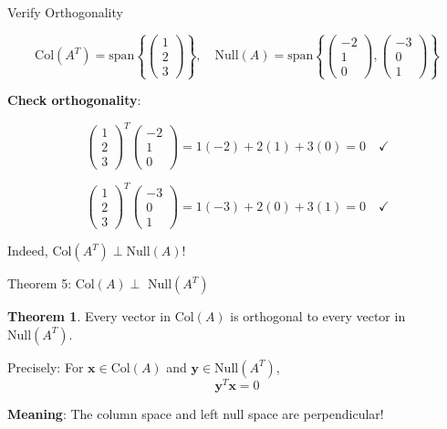 \documentclass[10pt]{beamer}
\theoremstyle{definition}
\newtheorem{thm}{Theorem}[section]
\newcommand{\x}[1]{\alert{\textbf{#1}}}
\begin{document}
\begin{frame}{Verify Orthogonality}

$$\text{Col}(A^T) = \text{span}\left\{\begin{pmatrix} 1\\2\\3 \end{pmatrix}\right\}, \quad \text{Null}(A) = \text{span}\left\{\begin{pmatrix} -2\\1\\0 \end{pmatrix}, \begin{pmatrix} -3\\0\\1 \end{pmatrix}\right\}$$

\x{Check orthogonality}:

$$\begin{pmatrix} 1\\2\\3 \end{pmatrix}^T \begin{pmatrix} -2\\1\\0 \end{pmatrix} = 1(-2) + 2(1) + 3(0) = 0 \quad \checkmark$$

$$\begin{pmatrix} 1\\2\\3 \end{pmatrix}^T \begin{pmatrix} -3\\0\\1 \end{pmatrix} = 1(-3) + 2(0) + 3(1) = 0 \quad \checkmark$$

Indeed, $\text{Col}(A^T) \perp \text{Null}(A)$!

\end{frame}

\begin{frame}{Theorem 5: Col$(A) \perp$ Null$(A^T)$}

\begin{thm}
Every vector in $\text{Col}(A)$ is orthogonal to every vector in $\text{Null}(A^T)$.

Precisely: For $\mathbf{x} \in \text{Col}(A)$ and $\mathbf{y} \in \text{Null}(A^T)$,
$$\mathbf{y}^T \mathbf{x} = 0$$
\end{thm}

\vspace{1em}

\x{Meaning}: The column space and left null space are perpendicular!

\end{frame}
\end{document}
